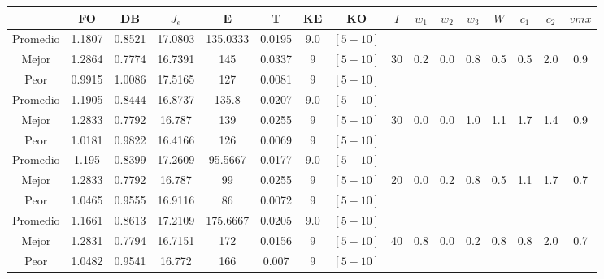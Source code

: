 \begin{table}[h!]
    \footnotesize
    \begin{center}
        \begin{tabular}{|c|c|c|c|c|c|c|c|c|c|c|c|c|c|c|c|}
        \hline
            & {\bf FO} & {\bf DB} & $J_e$ & {\bf E} & {\bf T} & {\bf KE} & {\bf KO} & $I$ & $w_1$ & $w_2$ & $w_3$ & $W$ & $c_1$ & $c_2$ & $vmx$ \\
        \hline
        \hline
            Promedio  & 1.1807 & 0.8521 & 17.0803 & 135.0333 & 0.0195 & 9.0 & $[5-10]$ &  &  &  &  &  &  &  & \\
            \cline{1-8}
            Mejor & 1.2864 & 0.7774  & 16.7391 & 145 & 0.0337 & 9 & $[5-10]$ & 30 & 0.2 & 0.0 & 0.8 & 0.5 & 0.5 & 2.0 & 0.9\\
            \cline{1-8}
            Peor & 0.9915 & 1.0086  & 17.5165 & 127 & 0.0081 & 9 & $[5-10]$ &  &  &  &  &  &  &  & \\
        \hline
        \hline
            Promedio  & 1.1905 & 0.8444 & 16.8737 & 135.8 & 0.0207 & 9.0 & $[5-10]$ &  &  &  &  &  &  &  & \\
            \cline{1-8}
            Mejor & 1.2833 & 0.7792  & 16.787 & 139 & 0.0255 & 9 & $[5-10]$ & 30 & 0.0 & 0.0 & 1.0 & 1.1 & 1.7 & 1.4 & 0.9\\
            \cline{1-8}
            Peor & 1.0181 & 0.9822  & 16.4166 & 126 & 0.0069 & 9 & $[5-10]$ &  &  &  &  &  &  &  & \\
        \hline
        \hline
            Promedio  & 1.195 & 0.8399 & 17.2609 & 95.5667 & 0.0177 & 9.0 & $[5-10]$ &  &  &  &  &  &  &  & \\
            \cline{1-8}
            Mejor & 1.2833 & 0.7792  & 16.787 & 99 & 0.0255 & 9 & $[5-10]$ & 20 & 0.0 & 0.2 & 0.8 & 0.5 & 1.1 & 1.7 & 0.7\\
            \cline{1-8}
            Peor & 1.0465 & 0.9555  & 16.9116 & 86 & 0.0072 & 9 & $[5-10]$ &  &  &  &  &  &  &  & \\
        \hline
        \hline
            Promedio  & 1.1661 & 0.8613 & 17.2109 & 175.6667 & 0.0205 & 9.0 & $[5-10]$ &  &  &  &  &  &  &  & \\
            \cline{1-8}
            Mejor & 1.2831 & 0.7794  & 16.7151 & 172 & 0.0156 & 9 & $[5-10]$ & 40 & 0.8 & 0.0 & 0.2 & 0.8 & 0.8 & 2.0 & 0.7\\
            \cline{1-8}
            Peor & 1.0482 & 0.9541  & 16.772 & 166 & 0.007 & 9 & $[5-10]$ &  &  &  &  &  &  &  & \\
        \hline
        \hline

\end{tabular}
\end{center}
\end{table}
